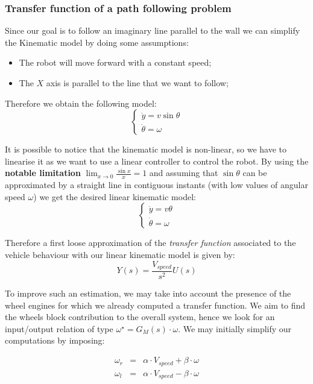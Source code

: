 \subsubsection{Transfer function of a path following problem}

Since our goal is to follow an imaginary line parallel to the wall we can simplify the Kinematic model by doing some assumptions:
\begin{itemize}
	\item The robot will move forward with a constant speed;
	\item The $X$ axis is parallel to the line that we want to follow;
\end{itemize}
Therefore we obtain the following model:
\[
\begin{cases}
	\dot y =  v \sin{}\theta{}\\
	\dot \theta = \omega 
\end{cases}
\]

It is possible to notice that the kinematic model is non-linear, so we have to linearise it as we want to use a linear controller to control the robot. By using the \textbf{notable limitation}  $\lim_{x\rightarrow 0} \frac{\sin{} x }{x} = 1  $ and assuming that  $\sin{}\theta$ can be approximated by a straight line in contiguous instants (with low values of angular speed $\omega$) we get the desired linear kinematic model:
\[
\begin{cases}
	\dot y =  v \theta{}\\
	\dot \theta = \omega 
\end{cases}
\]

Therefore a first loose approximation of the \textit{transfer function} associated to the vehicle behaviour with our linear kinematic model is given by:
\[
	Y(s) = \frac{V_{speed}}{s^2} U(s)
\]

To improve such an estimation, we may take into account the presence of the wheel engines for which we already computed a transfer function. We aim to find the wheels block contribution to the overall system, hence we look for an input/output relation of type $\omega^\star = G_M(s)\cdot\omega$. We may initially simplify our computations by imposing:

\[
\begin{array}{lcl}
\omega_r & = & \alpha\cdot V_{speed} + \beta\cdot\omega \\
\omega_l & = & \alpha\cdot V_{speed} - \beta\cdot\omega \\
\end{array}
\]

